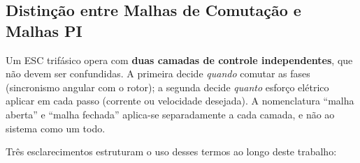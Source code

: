 \subsection{Distinção entre Malhas de Comutação e Malhas PI}
\label{subsec:distincao_malhas}

Um ESC trifásico opera com \textbf{duas camadas de controle independentes}, que não devem ser confundidas. A primeira decide \textit{quando} comutar as fases (sincronismo angular com o rotor); a segunda decide \textit{quanto} esforço elétrico aplicar em cada passo (corrente ou velocidade desejada). A nomenclatura ``malha aberta'' e ``malha fechada'' aplica-se separadamente a cada camada, e não ao sistema como um todo.

\begin{table}[htbp]
\centering
\caption{Duas camadas de controle no ESC deste trabalho}
\label{tab:camadas_controle}
\end{table}

Três esclarecimentos estruturam o uso desses termos ao longo deste trabalho:

